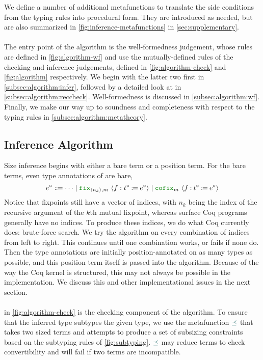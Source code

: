 We define a number of additional metafunctions to translate the side conditions from the typing rules into procedural form.
They are introduced as needed, but are also summarized in \autoref{fig:inference-metafunctions} in \autoref{sec:supplementary}.

\paragraph*{} The entry point of the algorithm is the well-formedness judgement,
whose rules are defined in \autoref{fig:algorithm-wf} and use the mutually-defined rules of the checking and inference judgements,
defined in \autoref{fig:algorithm-check} and \autoref{fig:algorithm} respectively.
We begin with the latter two first in \autoref{subsec:algorithm:infer},
followed by a detailed look at \RecCheck in \autoref{subsec:algorithm:reccheck}.
Well-formedness is discussed in \autoref{subsec:algorithm:wf}.
Finally, we make our way up to soundness and completeness with respect to the typing rules in \autoref{subsec:algorithm:metatheory}.

\subsection{Inference Algorithm}\label{subsec:algorithm:infer}

Size inference begins with either a bare term or a position term. For the bare terms, even type annotations of \cofixpoints are bare, \ie
  $$e^\circ \Coloneqq \dots
    \mid \fix{\seq{n_k}, m}{f}{t^\circ}{e^\circ}
    \mid \cofix{m}{f}{t^\circ}{e^\circ}$$
Notice that fixpoints still have a vector of indices, with $n_k$ being the index of the recursive argument of the $k$th mutual fixpoint, whereas surface Coq programs generally have no indices.
To produce these indices, we do what Coq currently does: brute-force search.
We try the algorithm on every combination of indices from left to right.
This continues until one combination works, or fails if none do.
Then the type annotations are initially position-annotated on as many types as possible,
and this position term itself is passed into the algorithm.
Because of the way the Coq kernel is structured, this may not always be possible in the implementation.
We discuss this and other implementational issues in the next section.




\paragraph*{}  in \autoref{fig:algorithm-check} is the checking component of the algorithm.
To ensure that the inferred type subtypes the given type, we use the metafunction $\constrain$ that takes two sized terms and attempts to produce a set of subsizing constraints based on the subtyping rules of \autoref{fig:subtyping}.
$\constrain$ may reduce terms to check convertibility and will fail if two terms are incompatible.

